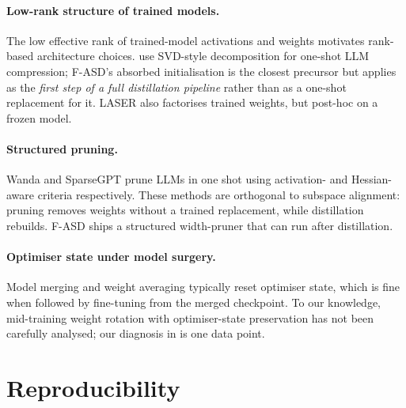 \documentclass[11pt]{article}
\newcommand{\fasd}{\textsc{F-ASD}}
\begin{document}
\paragraph{Low-rank structure of trained models.}
The low effective rank of trained-model activations
\citep{Aghajanyan2021,Sharma2024LASER} and weights \citep{Hu2022LoRA}
motivates rank-based architecture choices. \citet{Kaushal2023LoRD} use
SVD-style decomposition for one-shot LLM compression; \fasd{}'s
absorbed initialisation is the closest precursor but applies as the
\emph{first step of a full distillation pipeline} rather than as a
one-shot replacement for it. LASER \citep{Sharma2024LASER} also
factorises trained weights, but post-hoc on a frozen model.

\paragraph{Structured pruning.}
Wanda \citep{Sun2023Wanda} and SparseGPT
\citep{Frantar2023SparseGPT} prune LLMs in one shot using activation-
and Hessian-aware criteria respectively. These methods are orthogonal
to subspace alignment: pruning removes weights without a trained
replacement, while distillation rebuilds. \fasd{} ships a structured
width-pruner that can run after distillation.

\paragraph{Optimiser state under model surgery.}
Model merging and weight averaging
\citep{Wortsman2022ModelSoups,Yadav2023TIES} typically reset optimiser
state, which is fine when followed by fine-tuning from the merged
checkpoint. To our knowledge, mid-training weight rotation with
optimiser-state preservation has not been carefully analysed; our
diagnosis in  is one data point.

\section{Reproducibility}
\label{sec:repro}
\end{document}
